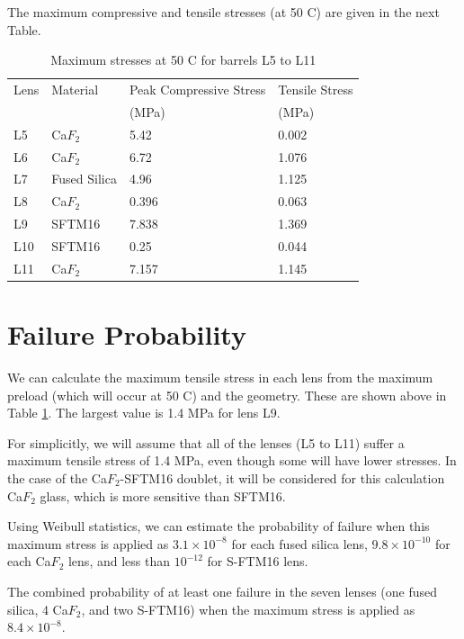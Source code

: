 \documentclass{report}
\begin{document}
The maximum compressive and tensile stresses (at 50 C) are given in the next Table.

\begin{table}
\caption{Maximum stresses at 50 C for barrels L5 to L11}
\label{table:stressL5L11}
\begin{center}
\small
\begin{tabular}{llll}
\hline
\hline
Lens 	&	Material	&	Peak Compressive Stress	&	Tensile Stress	\\
	&		&	(MPa)	&	(MPa)	\\
	\hline
L5	&	Ca$F_2$	&	5.42	&	0.002	\\
L6	&	Ca$F_2$	&	6.72	&	1.076	\\
L7	&	Fused Silica 	&	4.96	&	1.125	\\
L8	&	Ca$F_2$	&	0.396	&	0.063	\\
L9	&	SFTM16	&	7.838	&	1.369	\\
L10	&	SFTM16	&	0.25	&	0.044	\\
L11	&	Ca$F_2$	&	7.157	&	1.145	\\
\hline
\end{tabular}
\end{center}
\end{table}

\section{Failure Probability}

We can calculate the maximum tensile stress in each lens from the maximum preload (which will occur at 50 C) and the geometry. These are shown above in Table \ref{table:stressL5L11}. The largest value is 1.4 MPa for lens L9.

For simplicitly, we will assume that all of the lenses (L5 to L11) suffer a maximum tensile stress of 1.4 MPa, even though some will have lower stresses. 
In the case of the Ca$F_2$-SFTM16 doublet, it will be considered for this calculation Ca$F_2$ glass, which is more sensitive than SFTM16. 

Using Weibull statistics, we can estimate the probability of failure when this maximum stress is applied as $3.1\times 10^{-8}$ for each fused silica lens, $9.8\times 10^{-10}$ for each Ca$F_2$ lens, and less than $10^{-12}$ for S-FTM16 lens.

The combined probability of at least one failure in the seven lenses (one fused silica, 4 Ca$F_2$, and two S-FTM16) when the maximum stress is applied as $8.4\times 10^{-8}$.
\end{document}
